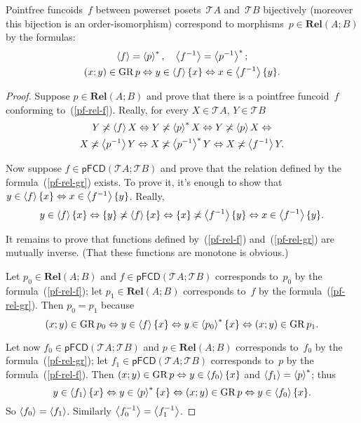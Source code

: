 \begin{thm}
\label{pf-rel}Pointfree funcoids~$f$ between powerset posets~$\mathscr{T}A$
and~$\mathscr{T}B$ bijectively (moreover this bijection is an order-isomorphism)
correspond to morphisms~$p\in\mathbf{Rel}(A;B)$ by the formulas:
\begin{gather}
\left\langle f\right\rangle=\left\langle p\right\rangle ^{\ast},\quad\left\langle f^{-1}\right\rangle=\left\langle p^{-1}\right\rangle ^{\ast};\label{pf-rel-f}\\
(x;y)\in\operatorname{GR} p\Leftrightarrow y\in\left\langle f\right\rangle\{x\}\Leftrightarrow x\in\left\langle f^{-1}\right\rangle\{y\}.\label{pf-rel-gr}
\end{gather}
\end{thm}
\begin{proof}
Suppose $p\in\mathbf{Rel}(A;B)$ and prove that there is a pointfree
funcoid~$f$ conforming to~(\ref{pf-rel-f}). Really, for every
$X\in\mathscr{T}A$, $Y\in\mathscr{T}B$ 
\begin{multline*}
Y\not\asymp\left\langle f\right\rangle X\Leftrightarrow Y\not\asymp\left\langle p\right\rangle ^{\ast}X\Leftrightarrow Y\not\asymp\left\langle p\right\rangle X\Leftrightarrow\\
X\not\asymp\left\langle p^{-1}\right\rangle Y\Leftrightarrow X\not\asymp\left\langle p^{-1}\right\rangle ^{\ast}Y\Leftrightarrow X\not\asymp\left\langle f^{-1}\right\rangle Y.
\end{multline*}


Now suppose $f\in\mathsf{pFCD}(\mathscr{T}A;\mathscr{T}B)$ and prove
that the relation defined by the formula~(\ref{pf-rel-gr}) exists.
To prove it, it's enough to show that $y\in\left\langle f\right\rangle\{x\}\Leftrightarrow x\in\left\langle f^{-1}\right\rangle\{y\}$.
Really, 
\[
y\in\left\langle f\right\rangle\{x\}\Leftrightarrow\{y\}\not\asymp\left\langle f\right\rangle\{x\}\Leftrightarrow\{x\}\not\asymp\left\langle f^{-1}\right\rangle\{y\}\Leftrightarrow x\in\left\langle f^{-1}\right\rangle\{y\}.
\]


It remains to prove that functions defined by~(\ref{pf-rel-f}) and~(\ref{pf-rel-gr})
are mutually inverse. (That these functions are monotone is obvious.)

Let $p_{0}\in\mathbf{Rel}(A;B)$ and $f\in\mathsf{pFCD}(\mathscr{T}A;\mathscr{T}B)$
corresponds to~$p_{0}$ by the formula~(\ref{pf-rel-f}); let $p_{1}\in\mathbf{Rel}(A;B)$
corresponds to~$f$ by the formula~(\ref{pf-rel-gr}). Then $p_{0}=p_{1}$
because 
\[
(x;y)\in\operatorname{GR} p_{0}\Leftrightarrow y\in\left\langle f\right\rangle\{x\}\Leftrightarrow y\in\left\langle p_{0}\right\rangle ^{\ast}\{x\}\Leftrightarrow(x;y)\in\operatorname{GR} p_{1}.
\]


Let now $f_{0}\in\mathsf{pFCD}(\mathscr{T}A;\mathscr{T}B)$ and $p\in\mathbf{Rel}(A;B)$
corresponds to~$f_{0}$ by the formula~(\ref{pf-rel-gr}); let $f_{1}\in\mathsf{pFCD}(\mathscr{T}A;\mathscr{T}B)$
corresponds to~$p$ by the formula~(\ref{pf-rel-f}). Then $(x;y)\in\operatorname{GR} p\Leftrightarrow y\in\left\langle f_{0}\right\rangle\{x\}$
and $\left\langle f_{1}\right\rangle=\left\langle p\right\rangle ^{\ast}$; thus 
\[
y\in\left\langle f_{1}\right\rangle\{x\}\Leftrightarrow y\in\left\langle p\right\rangle ^{\ast}\{x\}\Leftrightarrow(x;y)\in\operatorname{GR} p\Leftrightarrow y\in\left\langle f_{0}\right\rangle\{x\}.
\]
So $\left\langle f_{0}\right\rangle=\left\langle f_{1}\right\rangle$. Similarly $\left\langle f_{0}^{-1}\right\rangle=\left\langle f_{1}^{-1}\right\rangle$.\end{proof}
